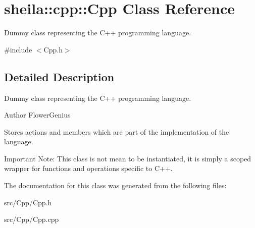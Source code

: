 \hypertarget{classsheila_1_1cpp_1_1Cpp}{}\section{sheila\+:\+:cpp\+:\+:Cpp Class Reference}
\label{classsheila_1_1cpp_1_1Cpp}


Dummy class representing the C++ programming language.  




{\ttfamily \#include $<$Cpp.\+h$>$}



\subsection{Detailed Description}
Dummy class representing the C++ programming language. 

\begin{DoxyAuthor}{Author}
Flower\+Genius
\end{DoxyAuthor}
Stores actions and members which are part of the implementation of the language.

Important Note\+: This class is not mean to be instantiated, it is simply a scoped wrapper for functions and operations specific to C++. 

The documentation for this class was generated from the following files\+:\begin{DoxyCompactItemize}
\item 
src/\+Cpp/Cpp.\+h\item 
src/\+Cpp/Cpp.\+cpp\end{DoxyCompactItemize}
